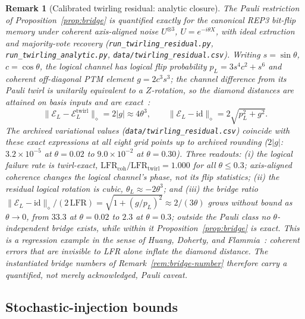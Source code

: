 \documentclass[pdflatex,sn-mathphys-num]{sn-jnl}
\theoremstyle{thmstyleone}
\theoremstyle{thmstyletwo}
\newtheorem{remark}{Remark}
\theoremstyle{thmstylethree}
\begin{document}
\begin{remark}[Calibrated twirling residual: analytic closure]\label{rem:twirl-num}
The Pauli restriction of Proposition~\ref{prop:bridge} is quantified exactly for the canonical REP3 bit-flip memory under coherent axis-aligned noise $U^{\otimes3}$, $U=e^{-i\theta X}$, with ideal extraction and majority-vote recovery (\texttt{run\_twirling\_\allowbreak residual.py}, \texttt{run\_twirling\_\allowbreak analytic.py}, \texttt{data/\allowbreak twirling\_\allowbreak residual.csv}). Writing $s=\sin\theta$, $c=\cos\theta$, the logical channel has logical flip probability $p_L=3s^{4}c^{2}+s^{6}$ and coherent off-diagonal PTM element $g=2c^{3}s^{3}$; the channel difference from its Pauli twirl is unitarily equivalent to a $Z$-rotation, so the diamond distances are attained on basis inputs and are \emph{exact}~\cite{Watrous2018}:
\begin{equation}
\|\mathcal{E}_L-\mathcal{E}_L^{\mathrm{twirl}}\|_{\diamond}=2|g|
\approx4\theta^{3},
\qquad
\|\mathcal{E}_L-\mathrm{id}\|_{\diamond}=2\sqrt{p_L^{2}+g^{2}}.
\end{equation}
The archived variational values (\texttt{data/twirling\_residual.csv}) coincide with these exact expressions at all eight grid points up to archived rounding ($2|g|$: $3.2\times10^{-5}$ at $\theta=0.02$ to $9.0\times10^{-2}$ at $\theta=0.30$). Three readouts: (i) the logical failure rate is twirl-exact, $\mathrm{LFR}_{\mathrm{coh}}/\mathrm{LFR}_{\mathrm{twirl}} =1.000$ for all $\theta\le0.3$; axis-aligned coherence changes the logical channel's phase, not its flip statistics; (ii) the residual logical rotation is cubic, $\theta_L\approx-2\theta^{3}$; and (iii) the bridge ratio $\|\mathcal{E}_L-\mathrm{id}\|_{\diamond}/(2\,\mathrm{LFR}) =\sqrt{1+(g/p_L)^{2}}\approx 2/(3\theta)$ grows without bound as $\theta\to0$, from $33.3$ at $\theta=0.02$ to $2.3$ at $\theta=0.3$; outside the Pauli class no $\theta$-independent bridge exists, while within it Proposition~\ref{prop:bridge} is exact. This is a regression example in the sense of Huang, Doherty, and Flammia~\cite{huang2019coherent}: coherent errors that are invisible to LFR alone inflate the diamond distance. The instantiated bridge numbers of Remark~\ref{rem:bridge-number} therefore carry a quantified, not merely acknowledged, Pauli caveat.
\end{remark}

\subsection{Stochastic-injection bounds}
\end{document}
